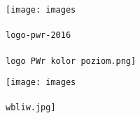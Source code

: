 \thispagestyle{empty} %

\begin{center}
    
    \centering
    \begin{figure}[h!]
        \centering
        \begin{subfigure}
            \centering
            \texttt{[image: images\\\\logo-pwr-2016\\\\logo PWr kolor poziom.png]}
        \end{subfigure}
        \hspace{3cm}%
        \centering
        \begin{subfigure}
            \centering
            \texttt{[image: images\\\\wbliw.jpg]}
        \end{subfigure}
    \end{figure}
    
    \printtitle
    
    \vfill
    
    \printauthor
    
    \printdate
\end{center}

\newpage              %
\setcounter{page}{1}  %